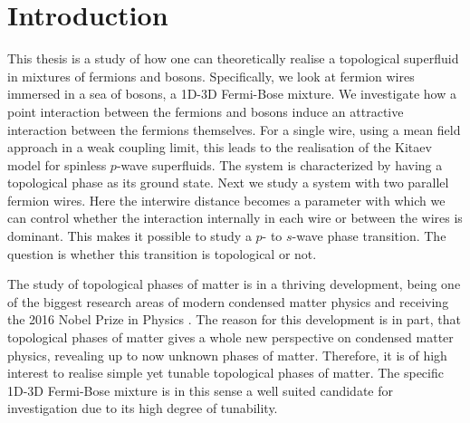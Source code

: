 
\chapter{Introduction} %

\label{Chapter1} %



This thesis is a study of how one can theoretically realise a topological superfluid in mixtures of fermions and bosons. Specifically, we look at fermion wires immersed in a sea of bosons, a 1D-3D Fermi-Bose mixture. We investigate how a point interaction between the fermions and bosons induce an attractive interaction between the fermions themselves. For a single wire, using a mean field approach in a weak coupling limit, this leads to the realisation of the Kitaev model for spinless $p$-wave superfluids. The system is characterized by having a topological phase as its ground state. Next we study a system with two parallel fermion wires. Here the interwire distance becomes a parameter with which we can control whether the interaction internally in each wire or between the wires is dominant. This makes it possible to study a $p$- to $s$-wave phase transition. The question is whether this transition is topological or not. 

The study of topological phases of matter is in a thriving development, being one of the biggest research areas of modern condensed matter physics and receiving the 2016 Nobel Prize in Physics \cite{NobelPrize2016}. The reason for this development is in part, that topological phases of matter gives a whole new perspective on condensed matter physics, revealing up to now unknown phases of matter. Therefore, it is of high interest to realise simple yet tunable topological phases of matter. The specific 1D-3D Fermi-Bose mixture is in this sense a well suited candidate for investigation due to its high degree of tunability. 

